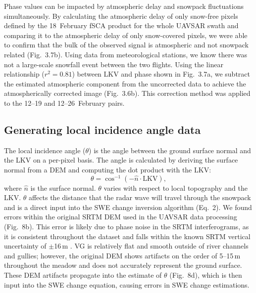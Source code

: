 Phase values can be impacted by atmospheric delay and snowpack fluctuations simultaneously. By calculating the atmospheric delay of only snow-free pixels defined by the 18~February fSCA product for the whole UAVSAR swath and comparing it to the atmospheric delay of only snow-covered pixels, we were able to confirm that the bulk of the observed signal is atmospheric and not snowpack related (Fig.~3.7b). Using data from meteorological stations, we know there was not a large-scale snowfall event between the two flights. Using the linear relationship ($r^{2} = 0.81$) between LKV and phase shown in Fig.~3.7a, we subtract the estimated atmospheric component from the uncorrected data to achieve the atmospherically corrected image (Fig.~3.6b). This correction method was applied to the 12--19  and 12--26~February pairs.

\hypertarget{ch3-methods-11}{\subsection{Generating local incidence angle data}\label{ch3-methods-11}}




The local incidence angle ($\theta$) is the angle between the ground surface normal and the LKV on a per-pixel basis. The angle is calculated by deriving the surface normal from a DEM and computing the dot product with the LKV:
\begin{equation}
\theta = \cos^{-1}(-\hat{n}\cdot \text{LKV}),
\end{equation}
where $\hat{n}$ is the surface normal. $\theta$ varies with respect to local topography and the LKV. $\theta$ affects the distance that the radar wave will travel through the snowpack and is a direct input into the SWE change inversion algorithm (Eq.~2). We found errors within the original SRTM DEM used in the UAVSAR data processing (Fig.~8b). This error is likely due to phase noise in the SRTM interferograms, as it is consistent throughout the dataset and falls within the known SRTM vertical uncertainty of $\pm$16\,m \citep{rodriguezGlobalAssessmentSRTM2006,sunValidationSurfaceHeight2003}. VG is relatively flat and smooth outside of river channels and gullies; however, the original DEM shows artifacts on the order of 5--15\,m throughout the meadow and does not accurately represent the ground surface. These DEM artifacts propagate into the estimate of $\theta$ (Fig.~8d), which is then input into the SWE change equation, causing errors in SWE change estimations.

